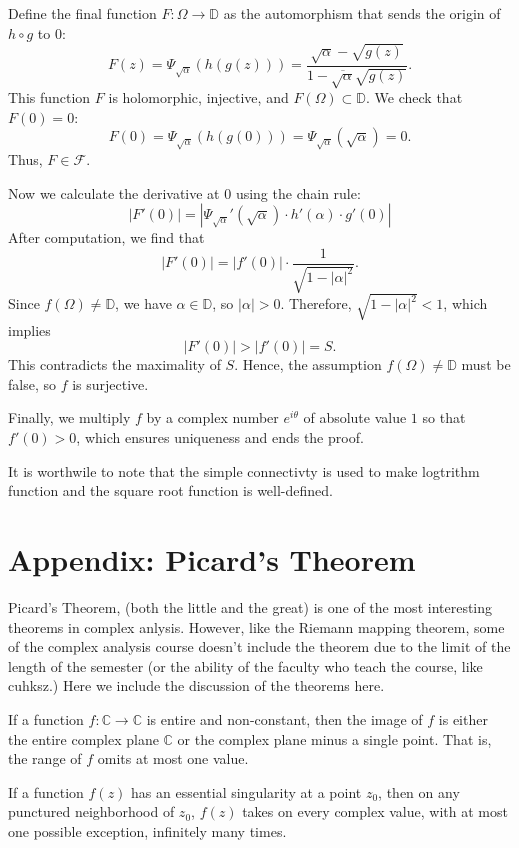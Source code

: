 \documentclass{article}
\begin{document}
Define the final function $F: \Omega \to \mathbb{D}$ as the automorphism that sends the origin of $h \circ g$ to $0$:
$$F(z) = \Psi_{\sqrt{\alpha}}(h(g(z))) = \frac{\sqrt{\alpha} - \sqrt{g(z)}}{1 - \overline{\sqrt{\alpha}} \sqrt{g(z)}}.$$
This function $F$ is holomorphic, injective, and $F(\Omega) \subset \mathbb{D}$. We check that $F(0)=0$:
$$F(0) = \Psi_{\sqrt{\alpha}}(h(g(0))) = \Psi_{\sqrt{\alpha}}(\sqrt{\alpha}) = 0.$$
Thus, $F \in \mathcal{F}$.

Now we calculate the derivative at $0$ using the chain rule:
$$|F'(0)| = \left| \Psi_{\sqrt{\alpha}}'(\sqrt{\alpha}) \cdot h'(\alpha) \cdot g'(0) \right|$$
After computation, we find that
$$|F'(0)| = |f'(0)| \cdot \frac{1}{\sqrt{1 - |\alpha|^2}}.$$
Since $f(\Omega) \ne \mathbb{D}$, we have $\alpha \in \mathbb{D}$, so $|\alpha| > 0$. Therefore, $\sqrt{1 - |\alpha|^2} < 1$, which implies
$$|F'(0)| > |f'(0)| = S.$$
This contradicts the maximality of $S$. Hence, the assumption $f(\Omega) \ne \mathbb{D}$ must be false, so $f$ is surjective.

Finally, we multiply $f$ by a complex number $e^{i\theta}$ of absolute value $1$ so that $f'(0) > 0$, which ensures uniqueness and ends the proof.

\begin{remark}
    It is worthwile to note that the simple connectivty is used to make logtrithm function and the square root function is well-defined.
\end{remark}

\newpage
\section{Appendix: Picard's Theorem}
Picard's Theorem, (both the little and the great) is one of the most interesting theorems in complex anlysis. However, like the Riemann mapping theorem, some of the complex analysis course doesn't include the theorem due to the limit of the length of the semester (or the ability of the faculty who teach the course, like cuhksz.) Here we include the discussion of the theorems here.

\begin{theorem}
If a function $f: \mathbb{C} \to \mathbb{C}$ is entire and non-constant, then the image of $f$ is either the entire complex plane $\mathbb{C}$ or the complex plane minus a single point. That is, the range of $f$ omits at most one value.
\end{theorem}

\begin{theorem}
If a function $f(z)$ has an essential singularity at a point $z_0$, then on any punctured neighborhood of $z_0$, $f(z)$ takes on every complex value, with at most one possible exception, infinitely many times.
\end{theorem}
\end{document}
